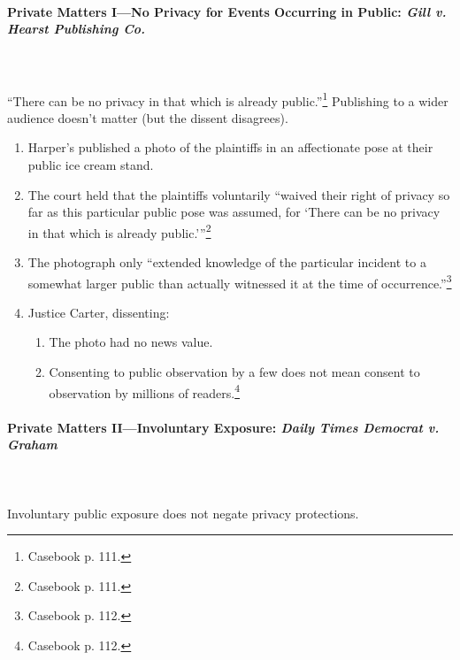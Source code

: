 \paragraph{Private Matters I---No Privacy for Events Occurring in Public: 
\emph{Gill v. Hearst Publishing Co.}}
~\\\\
``There can be no privacy in that which is already public.''\footnote{Casebook 
p. 111.} Publishing to a wider audience doesn't matter (but the dissent 
disagrees).

\begin{enumerate}
    \item Harper's published a photo of the plaintiffs in an affectionate pose 
    at their public ice cream stand.
    \item The court held that the plaintiffs voluntarily \enquote{waived their 
    right of privacy so far as this particular public pose was assumed, for 
    \enquote{There can be no privacy in that which is already 
    public.}}\footnote{Casebook p. 111.}
    \item The photograph only ``extended knowledge of the particular incident to 
    a somewhat larger public than actually witnessed it at the time of 
    occurrence.''\footnote{Casebook p. 112.}
    \item Justice Carter, dissenting:
    \begin{enumerate}
        \item The photo had no news value.
        \item Consenting to public observation by a few does not mean consent to 
        observation by millions of readers.\footnote{Casebook p. 112.}
    \end{enumerate}
\end{enumerate}

\paragraph{Private Matters II---Involuntary Exposure: \emph{Daily Times Democrat 
v. Graham}}
~\\\\
Involuntary public exposure does not negate privacy protections. 

